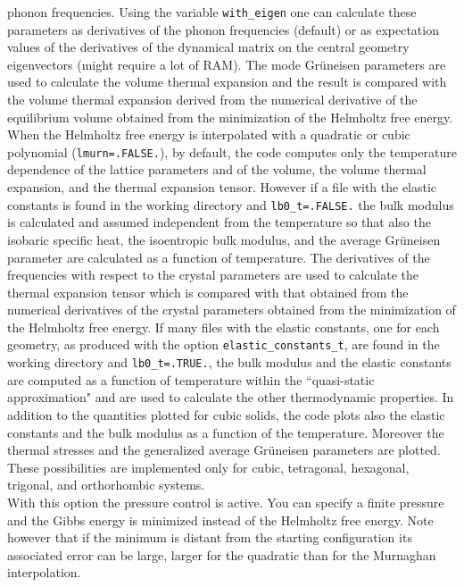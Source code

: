 \documentclass[12pt,a4paper]{article}
\begin{document}
phonon frequencies. Using the variable \texttt{with\_eigen} one can 
calculate these parameters as derivatives of the phonon frequencies 
(default) or as expectation values of the derivatives of the dynamical 
matrix on the central geometry eigenvectors (might require a lot of RAM). 
The mode Gr\"uneisen parameters are used to calculate the volume
thermal expansion and the result is compared with the volume thermal expansion
derived from the numerical derivative of the equilibrium volume obtained
from the minimization of the Helmholtz free energy. 
When the Helmholtz free energy is interpolated with a quadratic or cubic
polynomial (\texttt{lmurn=.FALSE.}), by default, the code computes only 
the temperature dependence of the lattice parameters and of the volume, the 
volume thermal expansion, and the thermal expansion tensor. However if a file 
with the elastic constants is found in the working directory 
and \texttt{lb0\_t=.FALSE.} the bulk modulus is calculated and 
assumed independent from the temperature so that also the isobaric specific 
heat, the isoentropic bulk modulus, and the average Gr\"uneisen parameter 
are calculated as a function of temperature. The derivatives of the 
frequencies with respect to the crystal parameters are used to calculate 
the thermal expansion tensor which 
is compared with that obtained from the numerical derivatives of the 
crystal parameters obtained from the minimization of the Helmholtz free energy.
If many files with the elastic constants, one for each geometry, as
produced with the option \texttt{elastic\_constants\_t}, are found
in the working directory and \texttt{lb0\_t=.TRUE.}, the bulk modulus and 
the elastic constants
are computed as a function of temperature within the ``quasi-static
approximation" and are used
to calculate the other thermodynamic properties. In addition to the
quantities plotted for cubic solids, the code plots also the elastic
constants and the bulk modulus as a function of the temperature. 
Moreover the thermal stresses and the generalized average Gr\"uneisen
parameters are plotted.
These possibilities are implemented only for cubic, tetragonal, 
hexagonal, trigonal, and orthorhombic systems. \\
With this option the pressure control is active. You can specify a
finite pressure and the Gibbs energy is minimized instead of the
Helmholtz free energy. Note however that if the minimum is distant from 
the starting configuration its associated error can be large, larger for the
quadratic than for the Murnaghan interpolation. \\
\end{document}
